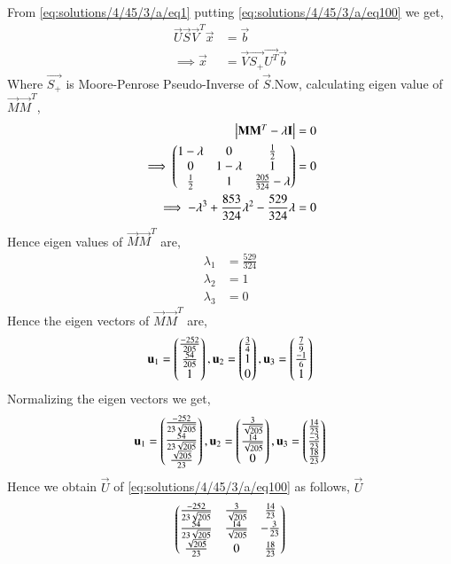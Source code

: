 From \eqref{eq:solutions/4/45/3/a/eq1} putting \eqref{eq:solutions/4/45/3/a/eq100} we get,
\begin{align}\label{eq:solutions/4/45/3/a/eqX}
\vec{U}\vec{S}\vec{V}^T\vec{x} & = \vec{b}\\
\implies\vec{x} &= \vec{V}\vec{S_+}\vec{U^T}\vec{b}
\end{align}
Where $\vec{S_+}$ is Moore-Penrose Pseudo-Inverse of $\vec{S}$.Now, calculating eigen value of $\vec{M}\vec{M}^T$,
\begin{align}
\begin{vmatrix}\mathbf{M}\mathbf{M}^T - \lambda\mathbf{I}\end{vmatrix} &= 0\\
\implies\begin{pmatrix}1-\lambda&0&\frac{1}{2}\\0&1-\lambda&1\\\frac{1}{2}&1&\frac{205}{324}-\lambda\end{pmatrix} &=0\\
\implies-\lambda^3+\frac{853}{324} \lambda^2-\frac{529}{324}\lambda &=0
\end{align}
Hence eigen values of $\vec{M}\vec{M}^T$ are,
\begin{align}
\lambda_1 &=\frac{529}{324}\\
\lambda_2 &= 1\\
\lambda_3 &=0
\end{align}
Hence the eigen vectors of $\vec{M}\vec{M}^T$ are,
\begin{align}
\mathbf{u}_1=\begin{pmatrix}\frac{-252}{205}\\\frac{54}{205}\\1\end{pmatrix},
\mathbf{u}_2=\begin{pmatrix}\frac{3}{4}\\1\\0\end{pmatrix},
\mathbf{u}_3=\begin{pmatrix}\frac{7}{9}\\\frac{-1}{6}\\1\end{pmatrix}
\end{align}
Normalizing the eigen vectors we get,
\begin{align}
\mathbf{u}_1=\begin{pmatrix}\frac{-252}{23\sqrt{205}}\\\frac{54}{23\sqrt{205}}\\\frac{\sqrt{205}}{{23}}\end{pmatrix},
\mathbf{u}_2=\begin{pmatrix}\frac{3}{\sqrt{205}}\\\frac{14}{\sqrt{205}}\\0\end{pmatrix},
\mathbf{u}_3=\begin{pmatrix}\frac{14}{23}\\\frac{-3}{23}\\\frac{18}{23}\end{pmatrix}
\end{align}
Hence we obtain $\vec{U}$ of \eqref{eq:solutions/4/45/3/a/eq100} as follows,
 $\vec{U}$\begin{align}\label{eq:solutions/4/45/3/a/eqU}
\begin{pmatrix}\frac{-252}{23\sqrt{205}}& \frac{3}{\sqrt{205}}&\frac{14}{23}\\
\frac{54}{23\sqrt{205}}&\frac{14}{\sqrt{205}}&-\frac{3}{23}\\
\frac{\sqrt{205}}{{23}}&0&\frac{18}{23}\end{pmatrix}
\end{align}
